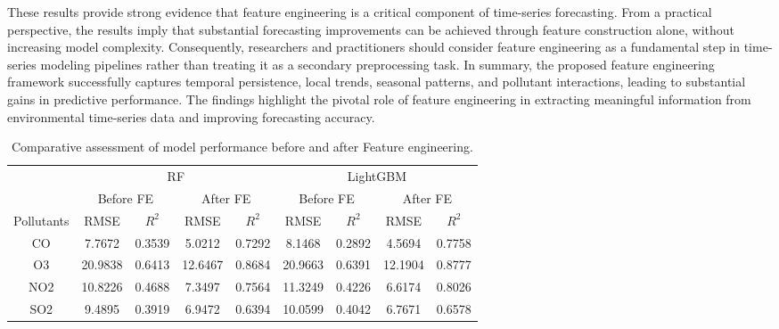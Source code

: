 \documentclass[twoside]{article}
\begin{document}
These results provide strong evidence that feature engineering is a critical component of time-series forecasting. 
From a practical perspective, the results imply that substantial forecasting improvements can be achieved through feature construction alone, without increasing model complexity. Consequently, researchers and practitioners should consider feature engineering as a fundamental step in time-series modeling pipelines rather than treating it as a secondary preprocessing task. 
In summary, the proposed feature engineering framework successfully captures temporal persistence, local trends, seasonal patterns, and pollutant interactions, leading to substantial gains in predictive performance. The findings highlight the pivotal role of feature engineering in extracting meaningful information from environmental time-series data and improving forecasting accuracy.



\begin{table}[h]
\begin{center}
\small
\caption{Comparative assessment of model performance before and after Feature engineering.}\label{tab1}
\begin{tabular}{|c|cc|cc|cc|cc|}
  \hline
                 & \multicolumn{4}{c|}{RF} & \multicolumn{4}{c|}{LightGBM}  \\
  \cline{2-9}
                & \multicolumn{2}{c|}{Before FE} & \multicolumn{2}{c|}{After FE} & \multicolumn{2}{c|}{Before FE} & \multicolumn{2}{c|}{After FE} \\
  \cline{2-9}
  Pollutants    & RMSE & $R^{2}$ & RMSE & $R^{2}$ & RMSE & $R^{2}$ & RMSE & $R^{2}$ \\ 
  \hline \hline
  CO            &7.7672 & 0.3539& 5.0212&0.7292 &8.1468 &0.2892 & 4.5694&0.7758 \\
  O3            &20.9838 &0.6413 & 12.6467& 0.8684&20.9663 &0.6391 &12.1904 &0.8777 \\
  NO2           &10.8226 & 0.4688&7.3497 &0.7564 &11.3249 &0.4226 &6.6174&0.8026 \\
  SO2           & 9.4895& 0.3919& 6.9472&0.6394&10.0599 & 0.4042&6.7671 &0.6578 \\
  \hline
\end{tabular}
\end{center}
\end{table}
\end{document}
